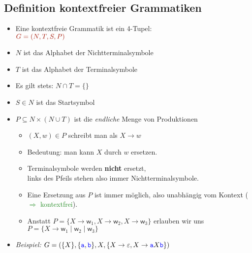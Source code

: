 \documentclass{article}
\newcommand{\blue}[1]{\textcolor{blue}{#1}}
\newcommand{\strongColor}[1]{\textcolor{strongColor}{#1}}
\newcommand{\strong}[1]{\textbf{\strongColor{#1}}}
\newcommand{\important}[1]{\textcolor{importantColor}{#1}}
\newcommand{\verweis}[1]{\textcolor{ForestGreen}{#1}}
\newcommand{\example}[1]{\textit{Beispiel: }#1}
\newcommand{\word}[1]{\blue{\texttt{#1}}}
\newcommand{\set}[1]{\{#1\}}
\newcommand{\w}{\textsf{w}}
\begin{document}
\subsection{Definition kontextfreier Grammatiken}
\begin{itemize}
    \item Eine kontextfreie Grammatik ist ein 4-Tupel:\\
    $\important{G=(N,T,S,P)}$
    \item \important{$N$} ist das Alphabet der \important{Nichtterminalsymbole}
    \item \important{$T$} ist das Alphabet der \important{Terminalsymbole}
    \item Es gilt stets: $N\cap T = \set{}$
    \item \important{$S \in N$} ist das \important{Startsymbol} 
    \item \important{$P \subseteq N \times (N\cup T)$} ist die \textit{endliche} Menge von \important{Produktionen}
    \begin{itemize}
        \item $(X, w) \in P$ schreibt man als $X \rightarrow w$
        \item Bedeutung: man kann $X$ durch $w$ ersetzen.
        \item Terminalsymbole werden \strong{nicht} ersetzt,\\links des Pfeils stehen also immer Nichtterminalsymbole.
        \item Eine Ersetzung aus $P$ ist immer möglich, also unabhängig vom Kontext (\verweis{$\Rightarrow$ kontextfrei}).
        \item Anstatt $P=\set{X\rightarrow\w_1, X\rightarrow\w_2,X\rightarrow\w_3}$ erlauben wir uns $P=\set{X\rightarrow\w_1\mid\w_2\mid\w_3}$
    \end{itemize}
    \item \example{$G=(\set{X}, \set{\word{a},\word{b}}, X, \set{X\rightarrow\varepsilon, X\rightarrow\word{a}X\word{b}})$}
\end{itemize}
\end{document}
